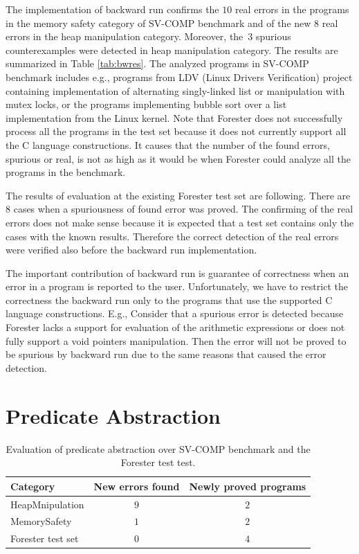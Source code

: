 The implementation of backward run confirms the $10$ real errors in the programs
in the memory safety category of SV-COMP benchmark and
of the new $8$ real errors in the heap manipulation category.
Moreover, the~$3$ spurious counterexamples were detected in heap manipulation category.
The results are summarized in Table \ref{tab:bwres}.
The analyzed programs in SV-COMP benchmark includes 
e.g., programs from LDV (Linux Drivers Verification) project
containing implementation of alternating singly-linked list
or manipulation with mutex locks, or the programs
implementing bubble sort over a list implementation from the Linux kernel.
Note that Forester does not successfully process all the programs in the test set
because it does not currently support all the C language constructions.
It causes that the number of the found errors, spurious or real, is not as high as it would be when
Forester could analyze all the programs in the benchmark.

The results of evaluation at the existing Forester test set are following.
There are $8$ cases when a spuriousness of found error was proved.
The confirming of the real errors does not make sense because
it is expected that a test set contains only the cases with the known results.
Therefore the correct detection of the real errors were verified
also before the backward run implementation.

The important contribution of backward run is guarantee of correctness when
an error in a program is reported to the user.
Unfortunately, we have to restrict the correctness the backward run
only to the programs that use the supported C language constructions.
E.g., Consider that a spurious error is detected because Forester lacks a support for
evaluation of the arithmetic expressions or does not fully support
a void pointers manipulation.
Then the error will not be proved to be spurious by backward run due to the
same reasons that caused the error detection.

\section{Predicate Abstraction}
\label{sec:paeval}

\begin{table}[buh!]
	\vskip6pt
	\caption{Evaluation of predicate abstraction over SV-COMP benchmark
		and the Forester test test.
	}
	\centering
	\begin{tabular}{lcc}
		\toprule
		Category & New errors found & Newly proved programs  \\
		\midrule
		HeapMnipulation & $9$ & $2$ \\
		MemorySafety & $1$ & $2$ \\
		Forester test set & $0$ & $4$  \\
		\bottomrule
	\end{tabular}
	\label{tab:pares}
\end{table}

